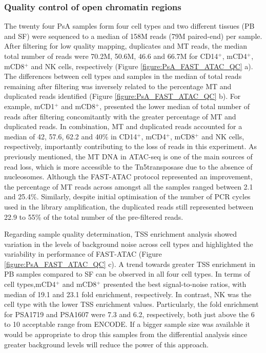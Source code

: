 \subsubsection{Quality control of open chromatin regions}
The twenty four PsA samples form four cell types and two different tissues (PB and SF) were sequenced to a median of 158M reads (79M paired-end) per sample. After filtering for low quality mapping, duplicates and MT reads, the median total number of reads were 70.2M, 50.6M, 46.6 and 66.7M for CD14$^+$, mCD4$^+$, mCD8$^+$ and NK cells, respectively (Figure \ref{figure:PsA_FAST_ATAC_QC} a). The differences between cell types and samples in the median of total reads remaining after filtering was inversely related to the percentage MT and duplicated reads identified (Figure \ref{figure:PsA_FAST_ATAC_QC} b). For example, mCD1$^+$ and mCD8$^+$, presented the lower median of total number of reads after filtering concomitantly with the greater percentage of MT and duplicated reads. In combination, MT and duplicated reads accounted for a median of 42, 57.6, 62.2 and 40\% in CD14$^+$, mCD4$^+$, mCD8$^+$ and NK cells, respectively, importantly contributing to the loss of reads in this experiment. As previously mentioned, the MT DNA in ATAC-seq is one of the main sources of read loss, which is more accessible to the Tn5transposase due to the absence of nucleosomes. Although the FAST-ATAC protocol represented an improvement, the percentage of MT reads across amongst all the samples ranged between 2.1 and 25.4\%. Similarly, despite initial optimisation of the number of PCR cycles used in the library amplification, the duplicated reads still represented between 22.9 to 55\% of the total number of the pre-filtered reads.

Regarding sample quality determination, TSS enrichment analysis showed variation in the levels of background noise across cell types and highlighted the variability in performance of FAST-ATAC (Figure \ref{figure:PsA_FAST_ATAC_QC} c). A trend towards greater TSS enrichment in PB samples compared to SF can be observed in all four cell types. In terms of cell types,mCD4$^+$ and mCD8$^+$ presented the best signal-to-noise ratios, with median of 19.1 and 23.1 fold enrichment, respectively. In contrast, NK was the cell type with the lower TSS enrichment values. Particularly, the fold enrichment for PSA1719 and PSA1607 were 7.3 and 6.2, respectively, both just above the 6 to 10 acceptable range from ENCODE. If a bigger sample size was available it would be appropriate to drop this samples from the differential analysis since greater background levels will reduce the power of this approach. 



